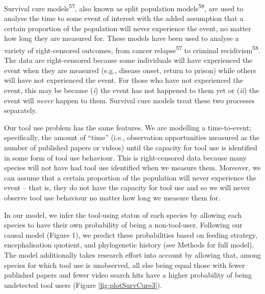 \documentclass[
  man, donotrepeattitle,floatsintext]{apa6}
\begin{document}
Survival cure models\textsuperscript{57}, also known as split population
models\textsuperscript{58}, are used to analyse the time to some event of interest
with the added assumption that a certain proportion of the population will never
experience the event, no matter how long they are measured for. These models
have been used to analyse a variety of right-censored outcomes, from cancer
relapse\textsuperscript{57} to criminal recidivism\textsuperscript{58}. The data are
right-censored because some individuals will have experienced the event when
they are measured (e.g., disease onset, return to prison) while others will have
not experienced the event. For those who have not experienced the event, this
may be because (\emph{i}) the event has not happened to them yet or (\emph{ii}) the event
will \emph{never} happen to them. Survival cure models treat these two processes
separately.

Our tool use problem has the same features. We are modelling a time-to-event;
specifically, the amount of ``time'' (i.e., observation opportunities measured as
the number of published papers or videos) until the capacity for tool use is
identified in some form of tool use behaviour. This is right-censored data
because many species will not have had tool use identified when we measure them.
Moreover, we can assume that a certain proportion of the population will never
experience the event -- that is, they do not have the capacity for tool use and
so we will never observe tool use behaviour no matter how long we measure them
for.

In our model, we infer the tool-using status of each species by allowing each
species to have their own probability of being a non-tool-user. Following our
causal model (Figure 1), we predict these probabilities based
on feeding strategy, encephalisation quotient, and phylogenetic history (see
Methods for full model). The model additionally takes research effort into
account by allowing that, among species for which tool use is unobserved, all
else being equal those with fewer published papers and fewer video search hits
have a higher probability of being undetected tool users (Figure
\ref{fig:plotSurvCure3}).
\end{document}
